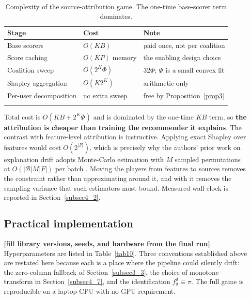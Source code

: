 \documentclass[pdflatex,sn-mathphys-num]{sn-jnl}%
\theoremstyle{thmstyleone}%
\theoremstyle{thmstyletwo}%
\theoremstyle{thmstylethree}%
\newcommand{\tbd}[1]{\textbf{[#1]}}
\begin{document}
\begin{table}[t]
\caption{Complexity of the source-attribution game. The one-time base-scorer term dominates.}\label{tab9}
\begin{tabular}{@{}lll@{}}
\toprule
Stage & Cost & Note \\
\midrule
Base scorers            & $O(KB)$        & paid once, not per coalition \\
Score caching           & $O(KP)$ memory & the enabling design choice \\
Coalition sweep         & $O(2^{K}\Phi)$ & $32\Phi$; $\Phi$ is a small convex fit \\
Shapley aggregation     & $O(K2^{K})$    & arithmetic only \\
Per-user decomposition  & no extra sweep & free by Proposition~\ref{prop3} \\
\botrule
\end{tabular}
\end{table}

Total cost is $O(KB+2^{K}\Phi)$ and is dominated by the one-time $KB$ term, so \textbf{the attribution is cheaper than training the recommender it explains}. The contrast with feature-level attribution is instructive. Applying exact Shapley over features would cost $O(2^{|F|})$, which is precisely why the authors' prior work on explanation drift adopts Monte-Carlo estimation with $M$ sampled permutations at $O(|\mathcal{B}|M|F|)$ per batch \cite{nesmaoui2026drift}. Moving the players from features to sources removes the constraint rather than approximating around it, and with it removes the sampling variance that such estimators must bound. Measured wall-clock is reported in Section~\ref{subsec4_2}.

\subsection{Practical implementation}\label{subsec3_11}

\tbd{fill library versions, seeds, and hardware from the final run}. Hyperparameters are listed in Table~\ref{tab10}. Three conventions established above are restated here because each is a place where the pipeline could silently drift: the zero-column fallback of Section~\ref{subsec3_3}, the choice of monotone transform in Section~\ref{subsec4_7}, and the identification $f_\theta^{\emptyset}\equiv\pi$. The full game is reproducible on a laptop CPU with no GPU requirement.
\end{document}
